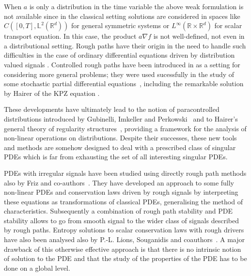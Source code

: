 \documentclass[11pt,a4paper]{amsart}
\newcommand{\RR}{\mathbb{R}}  \newcommand{\CC}{\mathbb{C}}  \newcommand{\LL}{\mathbb{L}}  \newcommand{\WW}{\mathbb{W}}
\newcommand{\ssk}{\smallskip}
\numberwithin{equation}{section} %
\begin{document}
When $a$ is only a distribution in the time variable the above weak formulation is not available since in the classical setting solutions are considered in spaces like $C([0,T],\LL^2(\RR^d))$ for general symmetric systems  or $L^\infty(\RR\times \RR^d)$ for scalar transport equation. In this case, the product $a\nabla f$ is not well-defined, not even in a distributional setting. Rough paths have their origin in the need to handle such difficulties in the case of ordinary differential equations driven by distribution valued signals \cite{Lyons98,Lyons2002,Lyons2007,Friz2010}. Controlled rough paths have been introduced in \cite{Gubinelli04} as a setting for considering more general problems; they were used sucessfully in the study of some stochastic partial differential equations~\cite{Bessaih2005,GT,Deya2012,Hairer2011,Gubinelli2012a,Hairer2012,Hairer2013},  including the remarkable solution by Hairer of the KPZ equation \cite{HairerKPZ}. 

\ssk

These developments have ultimately lead to the notion of paracontrolled distributions introduced by Gubinelli, Imkeller and Perkowski~\cite{GIP} and to Hairer's general theory of regularity structures~\cite{HairerRegularity},  providing a  framework for the analysis of non-linear operations on distributions. Despite their successes, these new tools and methods are somehow designed to deal with a prescribed class of singular PDEs which is far from exhausting the set of all interesting singular PDEs. 

\ssk

PDEs with irregular signals have been studied using directly rough path methods also by Friz and co-authors~\cite{Caruana2009, CaruanaFrizOberhauser, FrizOberhauser1, FrizOberhauser2, FrizGess}. They have developed an approach to some  fully non-linear PDEs and conservation laws driven by rough signals by interpreting these equations  as transformations of classical PDEs, generalising the method of characteristics. Subsequently a combination of rough path stability and PDE stability allows to go from smooth signal to the wider class of signals described by rough paths. Entropy solutions to scalar conservation laws with rough drivers have also been analysed also by P.-L. Lions, Souganidis and coauthors~\cite{LionsPerthameSouganidis1,LionsPerthameSouganidis2, GessSouganidis}. A major drawback of this otherwise effective approach is that there is no intrinsic notion of solution to the PDE and that the study of the properties of the PDE has to be done on a global level.
\end{document}
